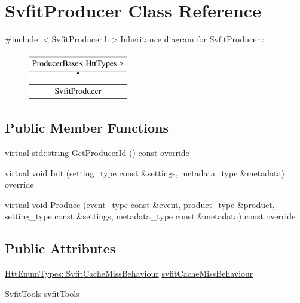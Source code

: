 \hypertarget{classSvfitProducer}{
\section{SvfitProducer Class Reference}
\label{classSvfitProducer}
}


{\ttfamily \#include $<$SvfitProducer.h$>$}Inheritance diagram for SvfitProducer::\begin{figure}[H]
\begin{center}
\leavevmode
\includegraphics[height=2cm]{classSvfitProducer}
\end{center}
\end{figure}
\subsection*{Public Member Functions}
\begin{DoxyCompactItemize}
\item 
virtual std::string \hyperlink{classSvfitProducer_a4d3e01005d6b27e53359d8d1ebf9cdd6}{GetProducerId} () const override
\item 
virtual void \hyperlink{classSvfitProducer_a4a9cbb8accbcec85effd108d5d6c0ee8}{Init} (setting\_\-type const \&settings, metadata\_\-type \&metadata) override
\item 
virtual void \hyperlink{classSvfitProducer_a46759a532a1e02fce1fc1d5a4a173d03}{Produce} (event\_\-type const \&event, product\_\-type \&product, setting\_\-type const \&settings, metadata\_\-type const \&metadata) const override
\end{DoxyCompactItemize}
\subsection*{Public Attributes}
\begin{DoxyCompactItemize}
\item 
\hyperlink{classHttEnumTypes_a51f8f038c31766e1b929398fa2239dcd}{HttEnumTypes::SvfitCacheMissBehaviour} \hyperlink{classSvfitProducer_a74c771b1c8d35938af552a7635844c76}{svfitCacheMissBehaviour}
\item 
\hyperlink{classSvfitTools}{SvfitTools} \hyperlink{classSvfitProducer_a5c2ef16c786f2db347ef45f1cc54500a}{svfitTools}
\end{DoxyCompactItemize}



